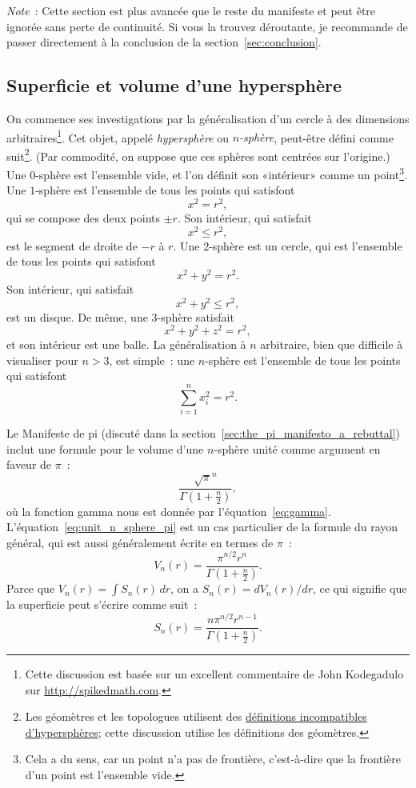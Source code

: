 \emph{Note}~: Cette section est plus avancée que le reste du manifeste et peut
être ignorée sans perte de continuité. Si vous la trouvez déroutante, je
recommande de passer directement à la conclusion de la
section~\ref{sec:conclusion}.

  \subsection{Superficie et volume d'une hypersphère} %
  \label{sec:volume_of_a_hypersphere}

On commence ses investigations par la généralisation d'un cercle à des
dimensions arbitraires\ns\footnote{Cette discussion est basée sur un excellent
commentaire de John Kodegadulo sur \url{http://spikedmath.com}.}. Cet objet,
appelé \emph{hypersphère} ou \emph{$n$-sphère}, peut-être défini comme
suit\ns\footnote{Les géomètres et les topologues utilisent des
\href{https://translate.google.com/translate?sl=en&tl=fr&u=https://mathworld.wolfram.com/Hypersphere.html}{définitions
incompatibles d'hypersphères}\ns; cette discussion utilise les définitions des
géomètres.}. (Par commodité, on suppose que ces sphères sont centrées sur
l'origine.) Une $0$-sphère est l'ensemble vide, et l'on définit son
«\ns intérieur\ns » comme un point\ns\footnote{Cela a du sens, car un point n'a pas
de frontière, c'est-à-dire que la frontière d'un point est l'ensemble vide.}.
Une $1$-sphère est l'ensemble de tous les points qui satisfont
\[
x^2 = r^2,
\]
qui se compose des deux points $\pm r$. Son intérieur, qui satisfait
\[
x^2 \leq r^2,
\]
est le segment de droite de $-r$ à $r$. Une $2$-sphère est un cercle, qui est
l'ensemble de tous les points qui satisfont
\[
x^2 + y^2 = r^2.
\]
Son intérieur, qui satisfait
\[
x^2 + y^2 \leq r^2,
\]
est un disque. De même, une $3$-sphère satisfait
\[
x^2 + y^2 + z^2 = r^2,
\]
et son intérieur est une balle. La généralisation à $n$ arbitraire, bien que
difficile à visualiser pour $n > 3$, est simple~: une $n$-sphère est l'ensemble
de tous les points qui satisfont
\[
\sum_{i=1}^{n} x_i^2 = r^2.
\]

Le Manifeste de pi (discuté dans la
section~\ref{sec:the_pi_manifesto_a_rebuttal}) inclut une formule pour le volume
d'une $n$-sphère unité comme argument en faveur de $\pi$~:
\begin{equation}
\label{eq:unit_n_sphere_pi}
\frac{\sqrt{\pi}^{n} }{\Gamma(1 + \frac{n}{2})},
\end{equation}
où la fonction gamma nous est donnée par l'équation~\eqref{eq:gamma}.
L'équation~\eqref{eq:unit_n_sphere_pi} est un cas particulier de la formule du
rayon général, qui est aussi généralement écrite en termes de $\pi$~:
\begin{equation}
\label{eq:n_sphere_pi}
V_n(r) = \frac{\pi^{n/2} r^n}{\Gamma(1 + \frac{n}{2})}.
\end{equation}
Parce que $V_n(r) = \int S_n(r)\,dr$, on a $S_n(r) = dV_n(r)/dr$, ce qui
signifie que la superficie peut s'écrire comme suit~:
\begin{equation}
\label{eq:n_sphere_pi_r}
S_n(r) = \frac{n \pi^{n/2} r^{n-1}}{\Gamma(1 + \frac{n}{2})}.
\end{equation}

